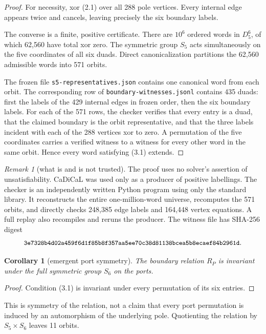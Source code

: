 \documentclass[11pt]{article}
\newtheorem{corollary}[theorem]{Corollary}
\theoremstyle{definition}
\theoremstyle{remark}
\newtheorem{remark}[theorem]{Remark}
\newcommand{\Dfive}{D_5}
\numberwithin{equation}{section}
\begin{document}
\begin{proof}
For necessity, xor (2.1) over all 288 pole vertices.  Every internal edge
appears twice and cancels, leaving precisely the six boundary labels.

The converse is a finite, positive certificate.  There are \(10^6\)
ordered words in \(\Dfive^6\), of which 62,560 have total xor zero.
The symmetric group \(S_5\) acts simultaneously on the five coordinates
of all six duads.  Direct canonicalization partitions the 62,560 admissible
words into 571 orbits.

The frozen file \texttt{s5-representatives.json} contains one canonical
word from each orbit.  The corresponding row of
\texttt{boundary-witnesses.jsonl} contains 435 duads: first the labels of
the 429 internal edges in frozen order, then the six boundary labels.  For
each of the 571 rows, the checker verifies that every entry is a duad, that
the claimed boundary is the orbit representative, and that the three
labels incident with each of the 288 vertices xor to zero.  A permutation
of the five coordinates carries a verified witness to a witness for every
other word in the same orbit.  Hence every word satisfying (3.1) extends.
\end{proof}

\begin{remark}[what is and is not trusted]
The proof uses no solver's assertion of unsatisfiability.  CaDiCaL was used
only as a producer of positive labellings.  The checker is an independently
written Python program using only the standard library.  It reconstructs
the entire one-million-word universe, recomputes the 571 orbits, and
directly checks 248,385 edge labels and 164,448 vertex equations.  A full
replay also recompiles and reruns the producer.  The witness file has
SHA-256 digest
\[
\small\texttt{3e7328b4d02a459f6d1f85b8f357aa5ee70c38d81138bcea5b8ecaef84b2961d}.
\]
\end{remark}

\begin{corollary}[emergent port symmetry]
The boundary relation \(R_P\) is invariant under the full symmetric group
\(S_6\) on the ports.
\end{corollary}

\begin{proof}
Condition (3.1) is invariant under every permutation of its six entries.
\end{proof}

This is symmetry of the relation, not a claim that every port permutation
is induced by an automorphism of the underlying pole.  Quotienting the
relation by \(S_5\times S_6\) leaves 11 orbits.
\end{document}
